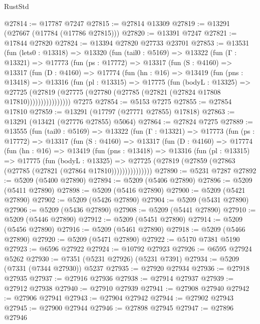 \begin{lexlean}{RustStd}
\begin{coremodule}
@27814 := @17787 @7247
@27815 := @27814 @13309
@27819 := @13291 (@27667 (@17784 (@17786 @27815)))
@27820 := @13391 @7247
@27821 := @17844 @27820
@27824 := @13394 @27820 @27733 @23701
@27853 := @13531
    (fun (lets0 : @13318) =>
    @13320
      (fun (tail0 : @5169) =>
      @13322
        (fun (Γ : @13321) =>
        @17773
          (fun (ps : @17772) =>
          @13317
            (fun (S : @4160) =>
            @13317
              (fun (D : @4160) =>
              @17774
                (fun (hn : @16) =>
                @13419
                  (fun (pns : @13418) =>
                  @13316
                    (fun (pl : @13315) =>
                    @17775
                      (fun (bodyL : @13325) =>
                      @27725
                        (@27819
                          (@27775 (@27780 (@27785 (@27821 (@27824 @17808 @17810))))))))))))))))
    @7275
@27854 := @5153 @7275
@27855 := @27854 @17810
@27859 := @13291 (@17797 (@27771 @27855) @17818)
@27863 := @13291 (@13421 (@27776 @27855) @5064)
@27864 := @27824 @7275
@27889 := @13555
    (fun (tail0 : @5169) =>
    @13322
      (fun (Γ : @13321) =>
      @17773
        (fun (ps : @17772) =>
        @13317
          (fun (S : @4160) =>
          @13317
            (fun (D : @4160) =>
            @17774
              (fun (hn : @16) =>
              @13419
                (fun (pns : @13418) =>
                @13316
                  (fun (pl : @13315) =>
                  @17775
                    (fun (bodyL : @13325) =>
                    @27725 (@27819 (@27859 (@27863 (@27785 (@27821 (@27864 @17810)))))))))))))))
@27890 := @5231 @7287
@27892 := @5209 (@5400 @27890)
@27894 := @5209 (@5406 @27890)
@27896 := @5209 (@5411 @27890)
@27898 := @5209 (@5416 @27890)
@27900 := @5209 (@5421 @27890)
@27902 := @5209 (@5426 @27890)
@27904 := @5209 (@5431 @27890)
@27906 := @5209 (@5436 @27890)
@27908 := @5209 (@5441 @27890)
@27910 := @5209 (@5446 @27890)
@27912 := @5209 (@5451 @27890)
@27914 := @5209 (@5456 @27890)
@27916 := @5209 (@5461 @27890)
@27918 := @5209 (@5466 @27890)
@27920 := @5209 (@5471 @27890)
@27922 := @5170 @7381 @5190
@27923 := @6596 @27922
@27924 := @10792 @27923
@27926 := @6595 @27924 @5262
@27930 := @7351 (@5231 @27926) (@5231 @7391)
@27934 := @5209 (@7331 (@7344 @27930)) @5237
@27935 := @27920 @27934
@27936 := @27918 @27935
@27937 := @27916 @27936
@27938 := @27914 @27937
@27939 := @27912 @27938
@27940 := @27910 @27939
@27941 := @27908 @27940
@27942 := @27906 @27941
@27943 := @27904 @27942
@27944 := @27902 @27943
@27945 := @27900 @27944
@27946 := @27898 @27945
@27947 := @27896 @27946

\end{coremodule}
\end{lexlean}
